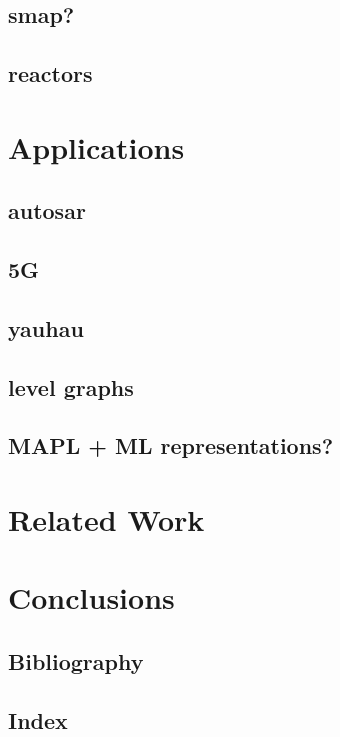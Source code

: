 \documentclass{report}
\begin{document}
\section{smap?}

\section{reactors}

\chapter{Applications}

\section{autosar}
\section{5G}
\section{yauhau}
\section{level graphs}
\section{MAPL + ML representations?}

\chapter{Related Work}


\chapter{Conclusions} 


\section*{Bibliography} 
\section*{Index} 
\end{document}
